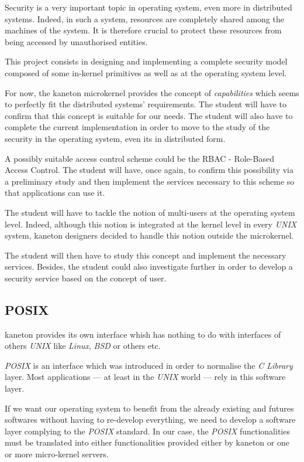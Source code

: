 \begin{multicols}{2}
Security is a very important topic in operating system, even more in
distributed systems. Indeed, in such a system, resources are completely
shared among the machines of the system. It is therefore crucial to protect
these resources from being accessed by unauthorised entities.

This project consists in designing and implementing a complete security
model composed of some in-kernel primitives as well as at the operating
system level.

For now, the kaneton microkernel provides the concept of \textit{capabilities}
which seems to perfectly fit the distributed systems' requirements. The student
will have to confirm that this concept is suitable for our needs. The student
will also have to complete the current implementation in order to move to
the study of the security in the operating system, even its in distributed
form.

A possibly suitable access control scheme could be the RBAC - Role-Based
Access Control. The student will have, once again, to confirm this
possibility via a preliminary study and then implement the services
necessary to this scheme so that applications can use it.

The student will have to tackle the notion of multi-users at the operating
system level. Indeed, although this notion is integrated at the kernel
level in every \textit{UNIX} system, kaneton designers decided to handle this
notion outside the microkernel.

The student will then have to study this concept and implement the necessary
services. Besides, the student could also investigate further in order
to develop a security service based on the concept of user.

%
%

\subsection{POSIX}

kaneton provides its own interface whish has nothing to do with interfaces
of others \textit{UNIX} like \textit{Linux}, \textit{BSD} or others etc.

\textit{POSIX} is an interface which was introduced in order to normalise the
\textit{C Library} layer. Most applications --- at least in the \textit{UNIX}
world --- rely in this software layer.

If we want our operating system to benefit from the already existing and
futures softwares without having to re-develop everything, we need to develop
a software layer complying to the \textit{POSIX} standard. In our case,
the \textit{POSIX} functionalities must be translated into either
functionalities provided either by kaneton or one or more micro-kernel
servers.


\end{multicols}
